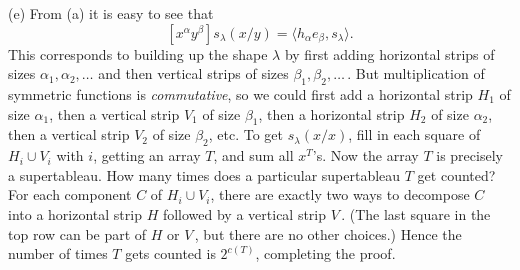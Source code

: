 (e) From (a) it is easy to see that
\[
[x^\alpha y^\beta]s_\lambda(x/y)=\langle h_\alpha e_\beta,s_\lambda\rangle.
\]
This corresponds to building up the shape $\lambda$ by first adding horizontal strips of sizes $\alpha_1,\alpha_2,\ldots$ and then vertical strips of sizes $\beta_1,\beta_2,\ldots$\,. But multiplication of symmetric functions is \emph{commutative}, so we could first add a horizontal strip $H_1$ of size $\alpha_1$, then a vertical strip $V_1$ of size $\beta_1$, then a horizontal strip $H_2$ of size $\alpha_2$, then a vertical strip $V_2$ of size $\beta_2$, etc. To get $s_\lambda(x/x)$, fill in each square of $H_i\cup V_i$ with $i$, getting an array $T$, and sum all $x^T$'s. Now the array $T$ is precisely a supertableau. How many times does a particular supertableau $T$ get counted? For each component $C$ of $H_i\cup V_i$, there are exactly two ways to decompose $C$ into a horizontal strip $H$ followed by a vertical strip $V$\,. (The last square in the top row can be part of $H$ or $V$\,, but there are no other choices.) Hence the number of times $T$ gets counted is $2^{c(T)}$, completing the proof.
